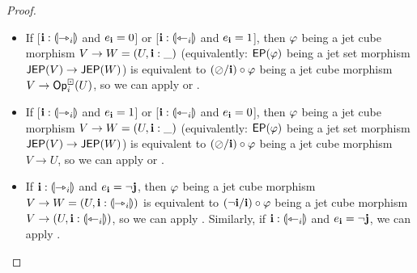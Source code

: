 \documentclass[a4paper]{memoir}
\begin{document}
\begin{proof}
	\begin{itemize}
		\item If [$\mathbf{i} : {\llparenthesis \rightarrowtriangle_i \rrparenthesis}$ and $e_{\mathbf{i}} = 0$] or [$\mathbf{i} : {\llparenthesis \leftarrowtriangle_i \rrparenthesis}$ and $e_{\mathbf{i}} = 1$], then $\varphi$ being a jet cube morphism $V \to W = (U, \mathbf{i} : \_)$ (equivalently: $\mathsf{EP}(\varphi)$ being a jet set morphism $\mathsf{JEP}(V) \to \mathsf{JEP}(W)$) is equivalent to $(\oslash / \mathbf{i}) \circ \varphi$ being a jet cube morphism $V \to {\mathsf{Op}}^\boxdot_i(U)$, so we can apply  or .
		
		\item If [$\mathbf{i} : {\llparenthesis \rightarrowtriangle_i \rrparenthesis}$ and $e_{\mathbf{i}} = 1$] or [$\mathbf{i} : {\llparenthesis \leftarrowtriangle_i \rrparenthesis}$ and $e_{\mathbf{i}} = 0$], then $\varphi$ being a jet cube morphism $V \to W = (U, \mathbf{i} : \_)$ (equivalently: $\mathsf{EP}(\varphi)$ being a jet set morphism $\mathsf{JEP}(V) \to \mathsf{JEP}(W)$) is equivalent to $(\oslash / \mathbf{i}) \circ \varphi$ being a jet cube morphism $V \to U$, so we can apply  or .
		
		\item If $\mathbf{i} : {\llparenthesis \rightarrowtriangle_i \rrparenthesis}$ and $e_{\mathbf{i}} = \lnot \mathbf{j}$, then $\varphi$ being a jet cube morphism $V \to W = (U, \mathbf{i} : {\llparenthesis \rightarrowtriangle_i \rrparenthesis})$ is equivalent to $(\lnot \mathbf{i} / \mathbf{i}) \circ \varphi$ being a jet cube morphism $V \to (U, \mathbf{i} : {\llparenthesis \leftarrowtriangle_i \rrparenthesis})$, so we can apply .
		Similarly, if $\mathbf{i} : {\llparenthesis \leftarrowtriangle_i \rrparenthesis}$ and $e_{\mathbf{i}} = \lnot \mathbf{j}$, we can apply .
		

\end{itemize}
\end{proof}
\end{document}
